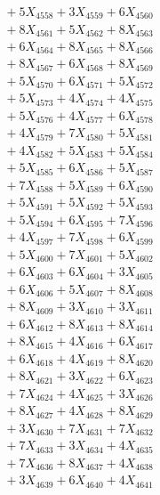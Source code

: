 \documentclass[a4paper,10pt]{article}
\begin{document}
{\begin{align}
&\;  + 5 X_{4558} + 3 X_{4559} + 6 X_{4560} \\[0.3ex]
&\;  + 8 X_{4561} + 5 X_{4562} + 8 X_{4563} \\[0.3ex]
&\;  + 6 X_{4564} + 8 X_{4565} + 8 X_{4566} \\[0.3ex]
&\;  + 8 X_{4567} + 6 X_{4568} + 8 X_{4569} \\[0.5ex]\allowbreak
&\;  + 5 X_{4570} + 6 X_{4571} + 5 X_{4572} \\[0.3ex]
&\;  + 5 X_{4573} + 4 X_{4574} + 4 X_{4575} \\[0.3ex]
&\;  + 5 X_{4576} + 4 X_{4577} + 6 X_{4578} \\[0.3ex]
&\;  + 4 X_{4579} + 7 X_{4580} + 5 X_{4581} \\[0.3ex]
&\;  + 4 X_{4582} + 5 X_{4583} + 5 X_{4584} \\[0.3ex]
&\;  + 5 X_{4585} + 6 X_{4586} + 5 X_{4587} \\[0.3ex]
&\;  + 7 X_{4588} + 5 X_{4589} + 6 X_{4590} \\[0.3ex]
&\;  + 5 X_{4591} + 5 X_{4592} + 5 X_{4593} \\[0.3ex]
&\;  + 5 X_{4594} + 6 X_{4595} + 7 X_{4596} \\[0.3ex]
&\;  + 4 X_{4597} + 7 X_{4598} + 6 X_{4599} \\[0.5ex]\allowbreak
&\;  + 5 X_{4600} + 7 X_{4601} + 5 X_{4602} \\[0.3ex]
&\;  + 6 X_{4603} + 6 X_{4604} + 3 X_{4605} \\[0.3ex]
&\;  + 6 X_{4606} + 5 X_{4607} + 8 X_{4608} \\[0.3ex]
&\;  + 8 X_{4609} + 3 X_{4610} + 3 X_{4611} \\[0.3ex]
&\;  + 6 X_{4612} + 8 X_{4613} + 8 X_{4614} \\[0.3ex]
&\;  + 8 X_{4615} + 4 X_{4616} + 6 X_{4617} \\[0.3ex]
&\;  + 6 X_{4618} + 4 X_{4619} + 8 X_{4620} \\[0.3ex]
&\;  + 8 X_{4621} + 3 X_{4622} + 6 X_{4623} \\[0.3ex]
&\;  + 7 X_{4624} + 4 X_{4625} + 3 X_{4626} \\[0.3ex]
&\;  + 8 X_{4627} + 4 X_{4628} + 8 X_{4629} \\[0.5ex]\allowbreak
&\;  + 3 X_{4630} + 7 X_{4631} + 7 X_{4632} \\[0.3ex]
&\;  + 7 X_{4633} + 3 X_{4634} + 4 X_{4635} \\[0.3ex]
&\;  + 7 X_{4636} + 8 X_{4637} + 4 X_{4638} \\[0.3ex]
&\;  + 3 X_{4639} + 6 X_{4640} + 4 X_{4641} \\[0.3ex]

\end{align}}
\end{document}
